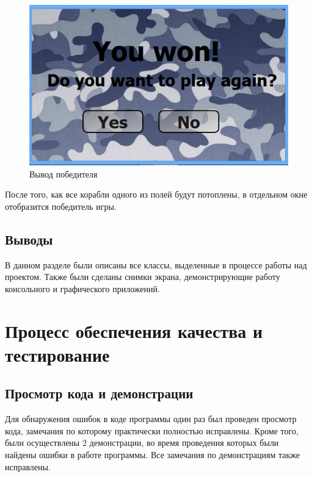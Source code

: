 \documentclass[a4paper]{article}
\begin{document}
\begin{figure}[H]
	\begin{center}
		\includegraphics[scale=0.5]{screen/GUI_winner.png}
		\caption{Вывод победителя} 
		\label{pic:pic_name} %
	\end{center}
\end{figure}

После того, как все корабли одного из полей будут потоплены, в отдельном окне отобразится победитель игры.

\subsection{Выводы}

В данном разделе были описаны все классы, выделенные в процессе работы над проектом. Также были сделаны снимки экрана, демонстрирующие работу консольного и графического приложений.

\section{Процесс обеспечения качества и тестирование}

\subsection{Просмотр кода и демонстрации}

Для обнаружения ошибок в коде программы один раз был проведен просмотр кода, замечания по которому практически полностью исправлены. Кроме того, были осуществлены 2 демонстрации, во время проведения которых были найдены ошибки в работе программы. Все замечания по демонстрациям также исправлены.
\end{document}
